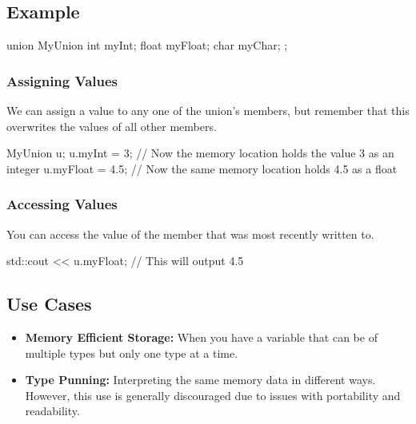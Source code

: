 \documentclass{report}
\begin{document}
    \bigbreak \noindent 
    \subsection{Example}
    \bigbreak \noindent 
    \begin{cppcode}
        union MyUnion {
            int myInt;
            float myFloat;
            char myChar;
        };
    \end{cppcode}
    \bigbreak \noindent 
    \bigbreak \noindent 
    \subsubsection{Assigning Values}
    \bigbreak \noindent 
    We can assign a value to any one of the union's members, but remember that this overwrites the values of all other members.
    \bigbreak \noindent 
    \begin{cppcode}
        MyUnion u;
        u.myInt = 3; // Now the memory location holds the value 3 as an integer
        u.myFloat = 4.5; // Now the same memory location holds 4.5 as a float
    \end{cppcode}
    \bigbreak \noindent 
    \subsubsection{Accessing Values}
    \bigbreak \noindent 
    You can access the value of the member that was most recently written to.
    \bigbreak \noindent 
    \begin{cppcode}
        std::cout << u.myFloat; // This will output 4.5
    \end{cppcode}

    \pagebreak \bigbreak \noindent 
    \subsection{Use Cases}
    \begin{itemize}
        \item \textbf{Memory Efficient Storage:} When you have a variable that can be of multiple types but only one type at a time.
        \item \textbf{Type Punning:} Interpreting the same memory data in different ways. However, this use is generally discouraged due to issues with portability and readability.
    \end{itemize}
    \bigbreak \noindent 
\end{document}
